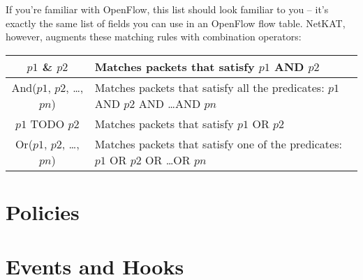If you're familiar with OpenFlow, this list should look familiar to you -- it's exactly the same list of fields you can 
use in an OpenFlow flow table. 
NetKAT, however, augments these matching rules with combination operators:

\bigskip
\begin{tabularx}{4in}{|c|X|}
\hline\hline
$p1$ \& $p2$ & Matches packets that satisfy $p1$ AND $p2$
\\ \hline  
And($p1$, $p2$, \ldots, $pn$) & Matches packets that satisfy all the predicates: $p1$ AND $p2$ AND \ldots AND $pn$
\\ \hline  
$p1$ TODO $p2$ & Matches packets that satisfy $p1$ OR $p2$
\\ \hline  
Or($p1$, $p2$, \ldots, $pn$) & Matches packets that satisfy one of the predicates: $p1$ OR $p2$ OR \ldots OR $pn$
\end{tabularx}


\section{Policies}

\section{Events and Hooks}

